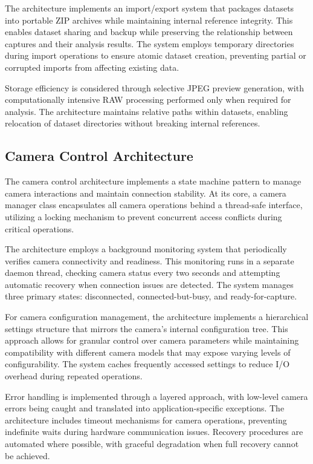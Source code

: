 The architecture implements an import/export system that packages datasets into portable ZIP archives while maintaining internal reference integrity. This enables dataset sharing and backup while preserving the relationship between captures and their analysis results. The system employs temporary directories during import operations to ensure atomic dataset creation, preventing partial or corrupted imports from affecting existing data.

Storage efficiency is considered through selective JPEG preview generation, with computationally intensive RAW processing performed only when required for analysis. The architecture maintains relative paths within datasets, enabling relocation of dataset directories without breaking internal references.

\subsection{Camera Control Architecture}
The camera control architecture implements a state machine pattern to manage camera interactions and maintain connection stability. At its core, a camera manager class encapsulates all camera operations behind a thread-safe interface, utilizing a locking mechanism to prevent concurrent access conflicts during critical operations.

The architecture employs a background monitoring system that periodically verifies camera connectivity and readiness. This monitoring runs in a separate daemon thread, checking camera status every two seconds and attempting automatic recovery when connection issues are detected. The system manages three primary states: disconnected, connected-but-busy, and ready-for-capture.

For camera configuration management, the architecture implements a hierarchical settings structure that mirrors the camera's internal configuration tree. This approach allows for granular control over camera parameters while maintaining compatibility with different camera models that may expose varying levels of configurability. The system caches frequently accessed settings to reduce I/O overhead during repeated operations.

Error handling is implemented through a layered approach, with low-level camera errors being caught and translated into application-specific exceptions. The architecture includes timeout mechanisms for camera operations, preventing indefinite waits during hardware communication issues. Recovery procedures are automated where possible, with graceful degradation when full recovery cannot be achieved.


